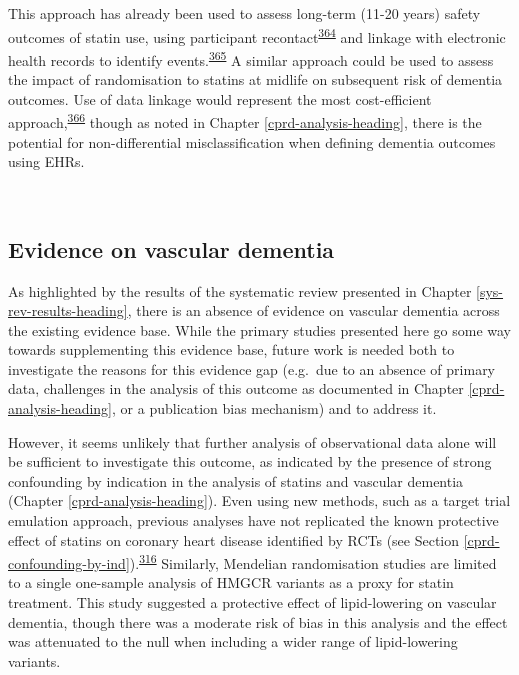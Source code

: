 \documentclass[a4paper, twoside]{templates/ociamthesis}
\begin{document}
This approach has already been used to assess long-term (11-20 years) safety outcomes of statin use, using participant recontact\textsuperscript{\protect\hyperlink{ref-group2011}{364}} and linkage with electronic health records to identify events.\textsuperscript{\protect\hyperlink{ref-ford2016}{365}} A similar approach could be used to assess the impact of randomisation to statins at midlife on subsequent risk of dementia outcomes. Use of data linkage would represent the most cost-efficient approach,\textsuperscript{\protect\hyperlink{ref-llewellyn-bennett2018}{366}} though as noted in Chapter \ref{cprd-analysis-heading}, there is the potential for non-differential misclassification when defining dementia outcomes using EHRs.

~

\hypertarget{evidence-on-vascular-dementia}{%
\subsection{Evidence on vascular dementia}\label{evidence-on-vascular-dementia}}

As highlighted by the results of the systematic review presented in Chapter \ref{sys-rev-results-heading}, there is an absence of evidence on vascular dementia across the existing evidence base. While the primary studies presented here go some way towards supplementing this evidence base, future work is needed both to investigate the reasons for this evidence gap (e.g.~due to an absence of primary data, challenges in the analysis of this outcome as documented in Chapter \ref{cprd-analysis-heading}, or a publication bias mechanism) and to address it.

However, it seems unlikely that further analysis of observational data alone will be sufficient to investigate this outcome, as indicated by the presence of strong confounding by indication in the analysis of statins and vascular dementia (Chapter \ref{cprd-analysis-heading}). Even using new methods, such as a target trial emulation approach, previous analyses have not replicated the known protective effect of statins on coronary heart disease identified by RCTs (see Section \ref{cprd-confounding-by-ind}).\textsuperscript{\protect\hyperlink{ref-danaei2013}{316}} Similarly, Mendelian randomisation studies are limited to a single one-sample analysis of HMGCR variants as a proxy for statin treatment. This study suggested a protective effect of lipid-lowering on vascular dementia, though there was a moderate risk of bias in this analysis and the effect was attenuated to the null when including a wider range of lipid-lowering variants.
\end{document}
